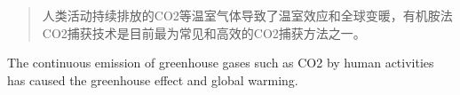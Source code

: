 \begin{abstract}
人类活动持续排放的CO2等温室气体导致了温室效应和全球变暖，有机胺法CO2捕获技术是目前最为常见和高效的CO2捕获方法之一。
\end{abstract}

\begin{enabstract}
The continuous emission of greenhouse gases such as CO2 by human activities has caused the greenhouse effect and global warming.
\end{enabstract}